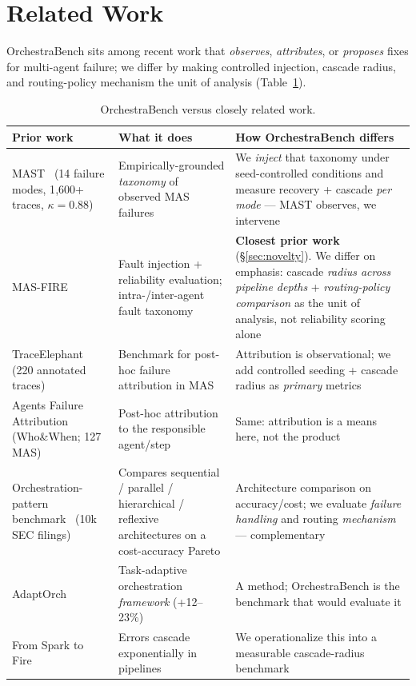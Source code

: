 \documentclass[sigconf,nonacm,anonymous]{acmart}  %
\begin{document}
\section{Related Work}
\label{sec:related}
OrchestraBench sits among recent work that \emph{observes}, \emph{attributes}, or
\emph{proposes} fixes for multi-agent failure; we differ by making controlled
injection, cascade radius, and routing-policy mechanism the unit of analysis
(Table~\ref{tab:related}).

\begin{table}[t]
\centering
\caption{OrchestraBench versus closely related work.}
\label{tab:related}
\small
\begin{tabular}{@{}p{3.4cm}p{6.0cm}p{6.0cm}@{}}
\toprule
\textbf{Prior work} & \textbf{What it does} & \textbf{How OrchestraBench differs} \\
\midrule
MAST~\cite{mast} (14 failure modes, 1{,}600+ traces, $\kappa{=}0.88$) &
Empirically-grounded \emph{taxonomy} of observed MAS failures &
We \emph{inject} that taxonomy under seed-controlled conditions and measure
recovery + cascade \emph{per mode} --- MAST observes, we intervene \\
MAS-FIRE~\cite{masfire} &
Fault injection + reliability evaluation; intra-/inter-agent fault taxonomy &
\textbf{Closest prior work} (\S\ref{sec:novelty}). We differ on emphasis: cascade
\emph{radius across pipeline depths} + \emph{routing-policy comparison} as the
unit of analysis, not reliability scoring alone \\
TraceElephant~\cite{traceelephant} (220 annotated traces) &
Benchmark for post-hoc failure attribution in MAS &
Attribution is observational; we add controlled seeding + cascade radius as
\emph{primary} metrics \\
Agents Failure Attribution~\cite{attribution} (Who\&When; 127 MAS) &
Post-hoc attribution to the responsible agent/step &
Same: attribution is a means here, not the product \\
Orchestration-pattern benchmark~\cite{orchpattern} (10k SEC filings) &
Compares sequential / parallel / hierarchical / reflexive architectures on a
cost-accuracy Pareto &
Architecture comparison on accuracy/cost; we evaluate \emph{failure handling} and
routing \emph{mechanism} --- complementary \\
AdaptOrch~\cite{adaptorch} &
Task-adaptive orchestration \emph{framework} (+12--23\%) &
A method; OrchestraBench is the benchmark that would evaluate it \\
From Spark to Fire~\cite{sparkfire} &
Errors cascade exponentially in pipelines &
We operationalize this into a measurable cascade-radius benchmark \\
\bottomrule
\end{tabular}
\end{table}
\end{document}

